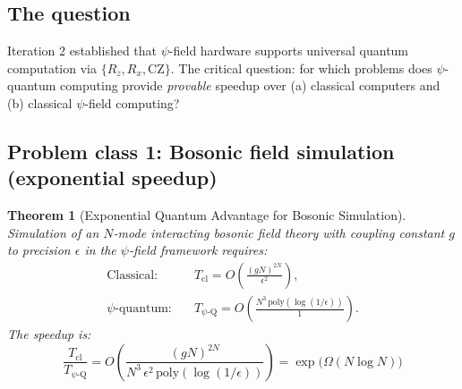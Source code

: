 \documentclass[11pt]{article}
\newtheorem{theorem}{Theorem}[section]
\theoremstyle{definition}
\theoremstyle{remark}
\begin{document}
\subsection{The question}

Iteration 2 established that $\psi$-field hardware supports universal
quantum computation via $\{R_z, R_x, \mathrm{CZ}\}$. The critical
question: for which problems does $\psi$-quantum computing provide
\emph{provable} speedup over (a) classical computers and
(b) classical $\psi$-field computing?

\subsection{Problem class 1: Bosonic field simulation (exponential speedup)}

\begin{theorem}[Exponential Quantum Advantage for Bosonic Simulation]
\label{thm:bosonic-advantage}
Simulation of an $N$-mode interacting bosonic field theory with
coupling constant $g$ to precision $\epsilon$ in the $\psi$-field
framework requires:
\begin{align}
\text{Classical:}&\quad T_{\mathrm{cl}} = O\!\left(\frac{(gN)^{2N}}{\epsilon^2}\right), \\
\text{$\psi$-quantum:}&\quad T_{\psi\text{-Q}} = O\!\left(\frac{N^3\,\mathrm{poly}(\log(1/\epsilon))}{1}\right).
\end{align}
The speedup is:
\begin{equation}
\boxed{
\frac{T_{\mathrm{cl}}}{T_{\psi\text{-Q}}} =
O\!\left(\frac{(gN)^{2N}}{N^3\,\epsilon^2\,\mathrm{poly}(\log(1/\epsilon))}\right)
= \exp\!\big(\Omega(N\log N)\big)
}
\label{eq:bosonic-speedup}
\end{equation}
\end{theorem}
\end{document}
